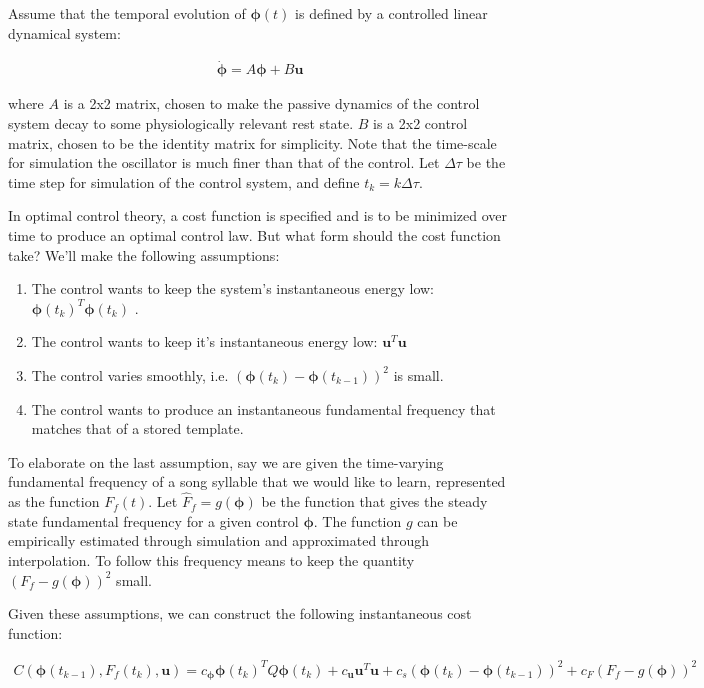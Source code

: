\documentclass{article} %
\begin{document}
Assume that the temporal evolution of $\bm{\phi}(t)$ is defined by a controlled linear dynamical
system:

\begin{align*}
\dot{\bm{\phi}}=A\bm{\phi} + B\bm{u}
\end{align*}

where $A$ is a 2x2 matrix, chosen to make the passive dynamics of the control system decay
to some physiologically relevant rest state. $B$ is a 2x2 control matrix, chosen to be the
identity matrix for simplicity. Note that the time-scale for simulation the oscillator is
much finer than that of the control. Let $\Delta\tau$ be the time step for simulation of
the control system, and define $t_k = k\Delta\tau$.

In optimal control theory, a cost function is specified and is to be minimized over time to
produce an optimal control law. But what form should the cost function take? We'll make
the following assumptions:

\begin{enumerate}

\item The control wants to keep the system's instantaneous energy low: $\bm{\phi}(t_k)^T \bm{\phi}(t_k)$ .
\item The control wants to keep it's instantaneous energy low: $\bm{u}^T \bm{u}$ 
\item The control varies smoothly, i.e. $\left( \bm{\phi}(t_k) - \bm{\phi}(t_{k-1}) \right)^2$ is small.
\item The control wants to produce an instantaneous fundamental frequency that matches that of a stored template.

\end{enumerate}

To elaborate on the last assumption, say we are given the time-varying fundamental frequency of a song syllable that we would
like to learn, represented as the function $F_f(t)$. Let $\hat{F}_f = g(\bm{\phi})$ be the function that gives the steady
state fundamental frequency for a given control $\bm{\phi}$. The function $g$ can be empirically estimated through simulation
and approximated through interpolation. To follow this frequency means to keep the quantity $\left( F_f - g(\bm{\phi}) \right) ^2$
small.

Given these assumptions, we can construct the following instantaneous cost function:

\begin{align*}
C \left( \bm{\phi}(t_{k-1}), F_f(t_k), \bm{u} \right) = c_{\bm{\phi}} \bm{\phi}(t_k)^T Q \bm{\phi}(t_k) +
							c_{\bm{u}} \bm{u}^T \bm{u} +
							c_s \left( \bm{\phi}(t_k) - \bm{\phi}(t_{k-1}) \right)^2 +
							c_F \left( F_f - g(\bm{\phi}) \right) ^2
\end{align*}
\end{document}
